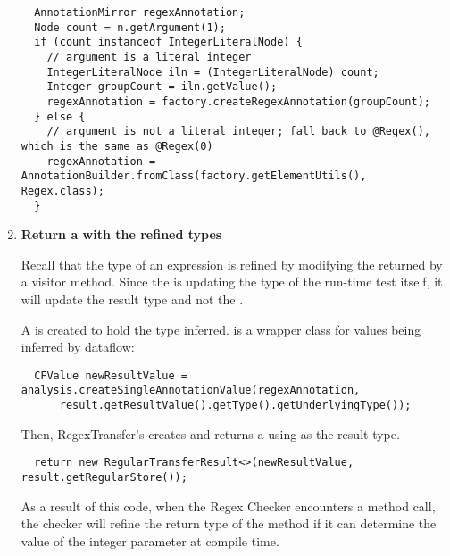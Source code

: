 \begin{enumerate}
\begin{smaller}
\begin{Verbatim}
  AnnotationMirror regexAnnotation;
  Node count = n.getArgument(1);
  if (count instanceof IntegerLiteralNode) {
    // argument is a literal integer
    IntegerLiteralNode iln = (IntegerLiteralNode) count;
    Integer groupCount = iln.getValue();
    regexAnnotation = factory.createRegexAnnotation(groupCount);
  } else {
    // argument is not a literal integer; fall back to @Regex(), which is the same as @Regex(0)
    regexAnnotation = AnnotationBuilder.fromClass(factory.getElementUtils(), Regex.class);
  }
\end{Verbatim}
\end{smaller}


\item \textbf{Return a  with the
    refined types}

Recall that the type of an expression is refined by modifying the
 returned by a visitor method.
Since the  is updating the type of
the run-time test itself, it will update the result type and not the
.

A  is created to hold the type inferred.
 is a wrapper class for values being inferred
by dataflow:
\begin{smaller}
\begin{Verbatim}
  CFValue newResultValue = analysis.createSingleAnnotationValue(regexAnnotation,
      result.getResultValue().getType().getUnderlyingType());
\end{Verbatim}
\end{smaller}

Then, RegexTransfer's  creates and returns a
 using  as the
result type.

\begin{smaller}
\begin{Verbatim}
  return new RegularTransferResult<>(newResultValue, result.getRegularStore());
\end{Verbatim}
\end{smaller}

As a result of this code, when the Regex Checker encounters a
 method call, the checker will refine the return
type of the method if it can determine the value of the integer parameter
at compile time.

\end{enumerate}


